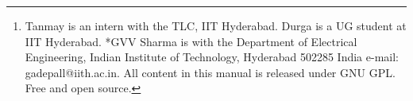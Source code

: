 \documentclass[journal,12pt,twocolumn]{IEEEtran}
\begin{document}
\author{Tanmay Agarwal, Durga Keerthi and G V V Sharma$^{*}$%
\thanks{Tanmay is an intern with the TLC, IIT Hyderabad.  Durga is a UG student at IIT Hyderabad.  *GVV Sharma is with the Department
of Electrical Engineering, Indian Institute of Technology, Hyderabad
502285 India e-mail:  gadepall@iith.ac.in. All content in this manual is released under GNU GPL.  Free and open source.}%
}
% 
%



% 




\end{document}
